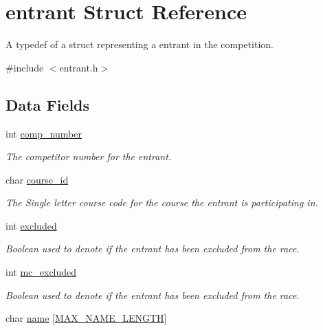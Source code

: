 \hypertarget{structentrant}{\section{entrant Struct Reference}
\label{structentrant}
}


A typedef of a struct representing a entrant in the competition.  




{\ttfamily \#include $<$entrant.\-h$>$}

\subsection*{Data Fields}
{\bf }\par
\begin{DoxyCompactItemize}
\item 
\hypertarget{structentrant_a255f1528ac4e76bea9dac1f10a360475}{int \hyperlink{structentrant_a255f1528ac4e76bea9dac1f10a360475}{comp\-\_\-number}}\label{structentrant_a255f1528ac4e76bea9dac1f10a360475}

\begin{DoxyCompactList}\small\item\em The competitor number for the entrant. \end{DoxyCompactList}\item 
\hypertarget{structentrant_afac79e4ab97ac6984e1c0b9ecfc641c8}{char \hyperlink{structentrant_afac79e4ab97ac6984e1c0b9ecfc641c8}{course\-\_\-id}}\label{structentrant_afac79e4ab97ac6984e1c0b9ecfc641c8}

\begin{DoxyCompactList}\small\item\em The Single letter course code for the course the entrant is participating in. \end{DoxyCompactList}\item 
int \hyperlink{structentrant_aec9dc2d3c3a9bd117ca635d2acddf6e5}{excluded}
\begin{DoxyCompactList}\small\item\em Boolean used to denote if the entrant has been excluded from the race. \end{DoxyCompactList}\item 
int \hyperlink{structentrant_a8a2f95c38b025e9bad015b2dfab113b5}{mc\-\_\-excluded}
\begin{DoxyCompactList}\small\item\em Boolean used to denote if the entrant has been excluded from the race. \end{DoxyCompactList}\item 
\hypertarget{structentrant_a997d236633398e9c4510d38d212d3fa2}{char \hyperlink{structentrant_a997d236633398e9c4510d38d212d3fa2}{name} \mbox{[}\hyperlink{entrant_8h_a0c397a708cec89c74029582574516b30}{M\-A\-X\-\_\-\-N\-A\-M\-E\-\_\-\-L\-E\-N\-G\-T\-H}\mbox{]}}\label{structentrant_a997d236633398e9c4510d38d212d3fa2}


\end{DoxyCompactItemize}
